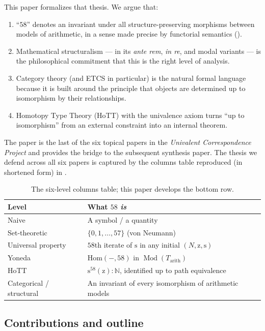 \documentclass[12pt]{article}
\theoremstyle{definition}
\theoremstyle{remark}
\newcommand{\Hom}{\mathrm{Hom}}
\newcommand{\NN}{\mathbb{N}}
\newcommand{\Mod}[1]{\operatorname{Mod}(#1)}
\newcommand{\succop}{\mathrm{s}}
\newcommand{\zeroop}{\mathrm{z}}
\begin{document}
This paper formalizes that thesis. We argue that:
\begin{enumerate}
  \item ``$58$'' denotes an invariant under all structure-preserving morphisms between models of arithmetic, in a sense made precise by functorial semantics ().
  \item Mathematical structuralism --- in its \emph{ante rem}, \emph{in re}, and modal variants --- is the philosophical commitment that this is the right level of analysis.
  \item Category theory (and ETCS in particular) is the natural formal language because it is built around the principle that objects are determined up to isomorphism by their relationships.
  \item Homotopy Type Theory (HoTT) with the univalence axiom turns ``up to isomorphism'' from an external constraint into an internal theorem.
\end{enumerate}

The paper is the last of the six topical papers in the \emph{Univalent Correspondence Project} and provides the bridge to the subsequent synthesis paper. The thesis we defend across all six papers is captured by the columns table reproduced (in shortened form) in .

\begin{table}[h]
\centering
\begin{tabular}{l|l}
\textbf{Level} & \textbf{What $58$ \emph{is}} \\\hline
Naive & A symbol / a quantity \\
Set-theoretic & $\{0,1,\dots,57\}$ (von Neumann) \\
Universal property & $58$th iterate of $\succop$ in any initial $(N,\zeroop,\succop)$ \\
Yoneda & $\Hom(-, 58)$ in $\Mod{T_{\mathrm{arith}}}$ \\
HoTT & $\succop^{58}(\zeroop) : \NN$, identified up to path equivalence \\
Categorical / structural & An invariant of every isomorphism of arithmetic models
\end{tabular}
\caption{The six-level columns table; this paper develops the bottom row.}
\label{tab:columns}
\end{table}

\subsection{Contributions and outline}
\end{document}
